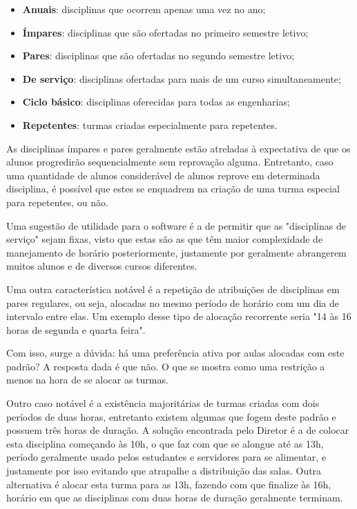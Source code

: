 \begin{itemize}
  \item \textbf{Anuais}: disciplinas que ocorrem apenas uma vez no ano;
  \item \textbf{Ímpares}: disciplinas que são ofertadas no primeiro semestre letivo;
  \item \textbf{Pares}: disciplinas que são ofertadas no segundo semestre letivo;
  \item \textbf{De serviço}: disciplinas ofertadas para mais de um curso simultaneamente;
  \item \textbf{Ciclo básico}: disciplinas oferecidas para todas as engenharias;
  \item \textbf{Repetentes}: turmas criadas especialmente para repetentes.
\end{itemize}


As disciplinas ímpares e pares geralmente estão atreladas à expectativa de que os alunos progredirão sequencialmente sem reprovação alguma. Entretanto, caso uma quantidade de alunos considerável de alunos reprove em determinada disciplina, é possível que estes se enquadrem na criação de uma turma especial para repetentes, ou não.

Uma sugestão de utilidade para o software é a de permitir que as "disciplinas de serviço" sejam fixas, visto que estas são as que têm maior complexidade de manejamento de horário posteriormente, justamente por geralmente abrangerem muitos alunos e de diversos cursos diferentes.

Uma outra característica notável é a repetição de atribuições de disciplinas em pares regulares, ou seja, alocadas no mesmo período de horário com um dia de intervalo entre elas. Um exemplo desse tipo de alocação recorrente seria "14 às 16 horas de segunda e quarta feira".

Com isso, surge a dúvida: há uma preferência ativa por aulas alocadas com este padrão? A resposta dada é que não. O que se mostra como uma restrição a menos na hora de se alocar as turmas.

Outro caso notável é a existência majoritárias de turmas criadas com dois períodos de duas horas, entretanto existem algumas que fogem deste padrão e possuem três horas de duração. A solução encontrada pelo Diretor é a de colocar esta disciplina começando às 10h, o que faz com que se alongue até as 13h, período geralmente usado pelos estudantes e servidores para se alimentar, e justamente por isso evitando que atrapalhe a distribuição das salas. Outra alternativa é alocar esta turma para as 13h, fazendo com que finalize às 16h, horário em que as disciplinas com duas horas de duração geralmente terminam.

